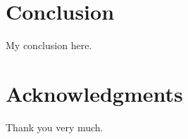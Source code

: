 \documentclass[11pt,a4paper,onecolumn,oneside]{report}
\begin{document}
    \section{Conclusion}
        My conclusion here.
    \clearpage

    
    
    \clearpage


    \section*{\hfill \Large Acknowledgments \hfill}
        Thank you very much.
    \clearpage

\hbox{ }
\thispagestyle{empty}
\clearpage
\end{document}
